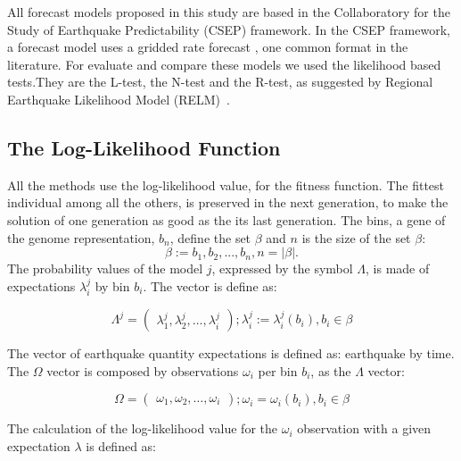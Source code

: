 All forecast models proposed in this study are based in the Collaboratory for the Study of Earthquake Predictability (CSEP) framework. In the CSEP framework, a forecast model uses a gridded rate forecast \cite{zechar2010evaluating}, one common format in the literature. For evaluate and compare these models we used the likelihood based tests.They are the L-test, the N-test and the R-test, as suggested by Regional Earthquake Likelihood Model (RELM)~\cite{schorlemmer2007earthquake}.\\
 


\subsection{The Log-Likelihood Function}
All the methods use the log-likelihood value, for the fitness
function. The fittest individual among all the others, is preserved in
the next generation, to make the solution of one generation as good as
the its last generation.  The bins, a gene of the genome
representation, $b_n$, define the set $\beta$ and $n$ is the size of
the set $\beta$:
\begin{equation} 
\beta := {b_1,b_2,...,b_n},n = |\beta|.
\end{equation}
The probability values of the model $j$, expressed by the symbol
$\Lambda$, is made of expectations $\lambda_i^j$ by bin $b_i$. The
vector is define as:
				
\begin{equation}
	\Lambda^j = 
\begin{pmatrix}
    \lambda_1^j, 
    \lambda_2^j, 
    \hdots,
    \lambda_i^j
  \end{pmatrix}
  ;\lambda_i^j := \lambda_i^j(b_i),b_i \in \beta
\end{equation}
		
The vector of earthquake quantity expectations is defined as:
earthquake by time. The $\Omega$ vector is composed by observations
$\omega_i$ per bin $b_i$, as the $\Lambda$ vector:

\begin{equation}
\Omega = 
\begin{pmatrix}
    \omega_1,
    \omega_2,
    \hdots,
    \omega_i
  \end{pmatrix}
  ;\omega_i =\omega_i(b_i),b_i \in \beta
\end{equation}

The calculation of the log-likelihood value for the $\omega_i$
observation with a given expectation $\lambda$ is defined as:


